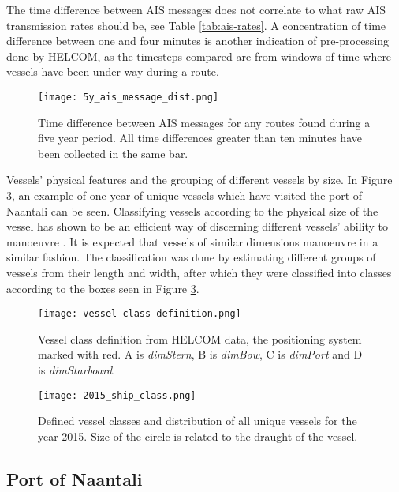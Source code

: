 \documentclass[../main.tex]{subfiles}
\begin{document}
The time difference between AIS messages does not correlate to what raw AIS transmission rates should be, see Table \ref{tab:ais-rates}. A concentration of time difference between one and four minutes is another indication of pre-processing done by HELCOM, as the timesteps compared are from windows of time where vessels have been under way during a route.

\begin{figure}[H]
	\centering
	\texttt{[image: 5y\_ais\_message\_dist.png]}
	\caption{Time difference between AIS messages for any routes found during a five year period. All time differences greater than ten minutes have been collected in the same bar.}
	\label{fig:ais-msg-dist}
\end{figure}


Vessels' physical features and the grouping of different vessels by size. In Figure \ref{fig:vessel-classes}, an example of one year of unique vessels which have visited the port of Naantali can be seen. Classifying vessels according to the physical size of the vessel has shown to be an efficient way of discerning different vessels' ability to manoeuvre \cite{Jahn_2018}. It is expected that vessels of similar dimensions manoeuvre in a similar fashion. The classification was done by estimating different groups of vessels from their length and width, after which they were classified into classes according to the boxes seen in Figure \ref{fig:vessel-classes}.

\begin{figure}[H]
	\centering
	\texttt{[image: vessel-class-definition.png]}
	\caption{Vessel class definition from HELCOM data, the positioning system marked with red. A is \textit{dimStern}, B is \textit{dimBow}, C is \textit{dimPort} and D is \textit{dimStarboard}.}
	\label{fig:vessel-class-def}
\end{figure}

\begin{figure}[H]
	\centering
	\texttt{[image: 2015\_ship\_class.png]}
	\caption{Defined vessel classes and distribution of all unique vessels for the year 2015. Size of the circle is related to the draught of the vessel.}
	\label{fig:vessel-classes}
\end{figure}

\newpage
\subsection{Port of Naantali}
\end{document}
